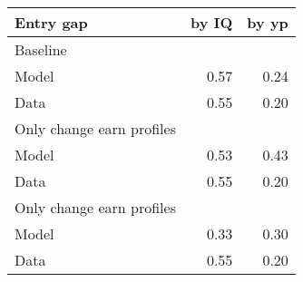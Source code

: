 \begin{tabular}{lrr}
\hline
Entry gap & by IQ  & by yp  \\
\hline
Baseline &   &   \\
Model & 0.57  & 0.24  \\
Data & 0.55  & 0.20  \\
Only change earn profiles &   &   \\
Model & 0.53  & 0.43  \\
Data & 0.55  & 0.20  \\
Only change earn profiles &   &   \\
Model & 0.33  & 0.30  \\
Data & 0.55  & 0.20  \\
\hline
\end{tabular}%
